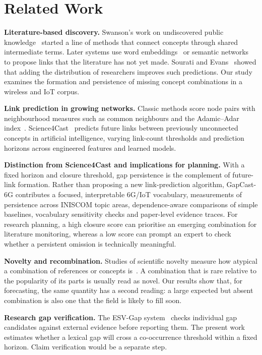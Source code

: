 \documentclass[runningheads]{llncs}
\newcommand{\bench}{GapCast-6G}
\begin{document}
\section{Related Work}

\textbf{Literature-based discovery.} Swanson's work on undiscovered public knowledge~\cite{swanson1986fish} started a line of methods that connect concepts through shared intermediate terms. Later systems use word embeddings~\cite{tshitoyan2019unsupervised} or semantic networks~\cite{krenn2020semnet} to propose links that the literature has not yet made. Sourati and Evans~\cite{sourati2023accelerating} showed that adding the distribution of researchers improves such predictions. Our study examines the formation and persistence of missing concept combinations in a wireless and IoT corpus.

\textbf{Link prediction in growing networks.} Classic methods score node pairs with neighbourhood measures such as common neighbours and the Adamic--Adar index~\cite{adamic2003friends,liben2007link}. Science4Cast~\cite{krenn2023forecasting} predicts future links between previously unconnected concepts in artificial intelligence, varying link-count thresholds and prediction horizons across engineered features and learned models.

\textbf{Distinction from Science4Cast and implications for planning.} With a fixed horizon and closure threshold, gap persistence is the complement of future-link formation. Rather than proposing a new link-prediction algorithm, \bench{} contributes a focused, interpretable 6G/IoT vocabulary, measurements of persistence across INISCOM topic areas, dependence-aware comparisons of simple baselines, vocabulary sensitivity checks and paper-level evidence traces. For research planning, a high closure score can prioritise an emerging combination for literature monitoring, whereas a low score can prompt an expert to check whether a persistent omission is technically meaningful.

\textbf{Novelty and recombination.} Studies of scientific novelty measure how atypical a combination of references or concepts is~\cite{uzzi2013atypical,foster2015tradition}. A combination that is rare relative to the popularity of its parts is usually read as novel. Our results show that, for forecasting, the same quantity has a second reading: a large expected but absent combination is also one that the field is likely to fill soon.

\textbf{Research gap verification.} The ESV-Gap system~\cite{le2027esvgap} checks individual gap candidates against external evidence before reporting them. The present work estimates whether a lexical gap will cross a co-occurrence threshold within a fixed horizon. Claim verification would be a separate step.
\end{document}
